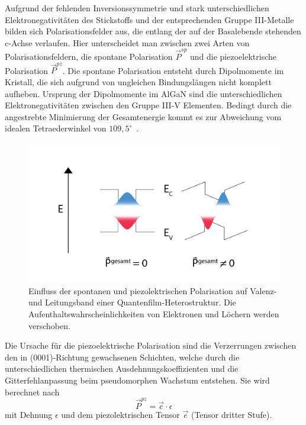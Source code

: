 Aufgrund der fehlenden Inversionssymmetrie und stark unterschiedlichen Elektronegativitäten des Stickstoffs und der entsprechenden Gruppe III-Metalle bilden sich Polarisationsfelder aus, die entlang der auf der Basalebende stehenden c-Achse verlaufen. Hier unterscheidet man zwischen zwei Arten von Polarisationsfeldern, die spontane Polarisation $ \vec{P}^{sp} $ und die piezoelektrische Polarisation $ \vec{P}^{pz} $. Die spontane Polarisation entsteht durch Dipolmomente im Kristall, die sich aufgrund von ungleichen Bindungslängen nicht komplett aufheben. Ursprung der 
Dipolmomente im AlGaN sind die unterschiedlichen Elektronegativitäten zwischen den Gruppe III-V Elementen. Bedingt durch die angestrebte Minimierung der Gesamtenergie kommt es zur Abweichung vom idealen Tetraederwinkel von $109,5^{\circ}$~\cite{ambacher2002}.
%
\begin{figure}[htb]
    \centering
    \begin{minipage}[t]{1.0\linewidth}
        \centering
        \includegraphics[width=0.7\linewidth]{Bilder/QCSE.png}
    \end{minipage}%
    \caption{Einfluss der spontanen und piezolektrischen Polarisation auf Valenz- und Leitungsband einer Quantenfilm-Heterostruktur. Die Aufenthaltswahrscheinlichkeiten von Elektronen und Löchern werden verschoben.}
        \label{fig:qcse}
\end{figure}
\noindent
Die Ursache für die piezoelektrische Polarisation sind die Verzerrungen zwischen den in (0001)-Richtung gewachsenen Schichten, welche durch die unterschiedlichen thermischen Ausdehnungskoeffizienten und die Gitterfehlanpassung beim pseudomorphen Wachstum entstehen. Sie wird berechnet nach
%
\begin{equation}
    \vec{P}^{pz} = \vec{e} \cdot \epsilon
\end{equation}
%
mit Dehnung $\epsilon$ und dem piezolektrischen Tensor $\vec{e}$ (Tensor dritter Stufe).
\newline
